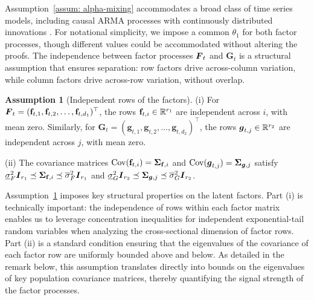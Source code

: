 \documentclass[11pt,letterpaper]{article}
\newcommand{\bfm}[1]{\ensuremath{\boldsymbol{#1}}} %
\def\bg{\bfm g}   \def\bG{\bfm G}  \def\GG{\mathbb{G}}
\DeclareMathOperator{\Cov}{Cov}
\theoremstyle{definition}
\newtheorem{assumption}{Assumption}
\newcommand{\bfv}{\mathbf{f}}
\begin{document}
Assumption~\ref{assum: alpha-mixing} accommodates a broad class of time series models, including causal ARMA processes with continuously distributed innovations \citep{tsay2010analysis,tsay2018nonlinear,fan2003nonlinear}. 
For notational simplicity, we impose a common $\theta_1$ for both factor processes, though different values could be accommodated without altering the proofs. The independence between factor processes $\bF_t$ and $\bG_t$ is a structural assumption that ensures separation: row factors drive across-column variation, while column factors drive across-row variation, without overlap. 




\begin{assumption}[Independent rows of the factors]
\label{assum: independent factor rows}  
(i) For $\bF_t = (\bfv_{t,1}, \bfv_{t,2}, \dots, \bfv_{t,d_1})^\top$, the rows $\bfv_{t, i} \in \RR^{r_1}$ are independent across $i$, with mean zero. Similarly, for $\bG_t = (\bg_{t,1}, \bg_{t,2}, \dots, \bg_{t,d_2})^\top$, the rows $\bg_{t,j}\in \RR^{r_2}$ are independent across $j$, with mean zero.

(ii) The covariance matrices $\Cov(\bfv_{t, i}) = \bSigma_{\bfv, i}$ and $\Cov(\bg_{t, j}) = \bSigma_{\bg, j}$ satisfy $\underline{\sigma}_{ F}^2 \bI_{r_1} \preceq \bSigma_{\bfv, i} \preceq \overline{\sigma}_{F}^2 \bI_{r_1}$ and $\underline{\sigma}_{G}^2 \bI_{r_2} \preceq \bSigma_{\bg, j} \preceq \overline{\sigma}_{G}^2 \bI_{r_2}$.
\end{assumption}


Assumption~\ref{assum: independent factor rows} imposes key structural properties on the latent factors. Part (i) is technically important: the independence of rows within each factor matrix enables us to leverage concentration inequalities for independent exponential-tail random variables when analyzing the cross-sectional dimension of factor rows. Part (ii) is a standard condition ensuring that the eigenvalues of the covariance of each factor row are uniformly bounded above and below. As detailed in the remark below, this assumption translates directly into bounds on the eigenvalues of key population covariance matrices, thereby quantifying the signal strength of the factor processes.
\end{document}
